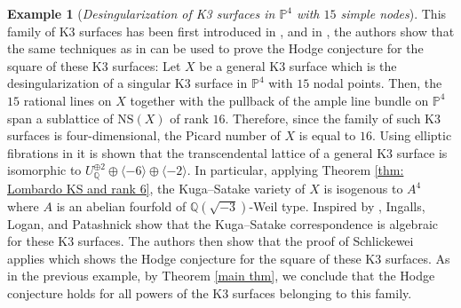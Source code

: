 \documentclass[11pt,twoside,a4paper]{amsart}
\newcommand{\0}{\mathscr{O}}
\newcommand{\p}{\mathbb{P}}
\newcommand{\Q}{\mathbb{Q}}
\theoremstyle{plain}
\theoremstyle{definition}
\newtheorem{exmp}[thm]{Example}
\theoremstyle{remark}
\begin{document}
\begin{exmp}[\textit{Desingularization of K3 surfaces in $\p^4$ with $15$ simple nodes}]
This family of K3 surfaces has been first introduced in \cite{garbagnati2016kummer}, and in \cite{ingalls2020explicit}, the authors show that the same techniques as in \cite{schlickewei2010hodge} can be used to prove the Hodge conjecture for the square of these K3 surfaces:
Let $X$ be a general K3 surface which is the desingularization of a singular K3 surface in $\p^4$ with $15$ nodal points. Then, the $15$ rational lines on $X$ together with the pullback of the ample line bundle on $\p^4$ span a sublattice of $\mathrm{NS}(X)$ of rank $16$. Therefore, since the family of such K3 surfaces is four-dimensional, the Picard number of $X$ is equal to $16$.
Using elliptic fibrations in \cite[Rmk.\ 4.8]{ingalls2020explicit} it is shown that the transcendental lattice of a general K3 surface is isomorphic to
$U^{\oplus 2}_\Q\oplus\langle -6\rangle\oplus\langle -2\rangle.$
In particular, applying Theorem \ref{thm: Lombardo KS and rank 6}, the Kuga--Satake variety of $X$ is isogenous to $A^4$ where $A$ is an abelian fourfold of $\Q(\sqrt{-3})$-Weil type. Inspired by \cite{paranjape}, Ingalls, Logan, and Patashnick \cite{ingalls2020explicit} show that the Kuga--Satake correspondence is algebraic for these K3 surfaces. The authors then show that the proof of Schlickewei applies which shows the Hodge conjecture for the square of these K3 surfaces. As in the previous example, by Theorem \ref{main thm}, we conclude that the Hodge conjecture holds for all powers of the K3 surfaces belonging to this family.
\end{exmp}
\newpage




\end{document}
